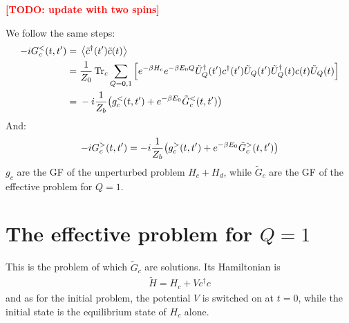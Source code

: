 \documentclass[12pt]{article}
\newcommand\TODO[1]{\textcolor{red}{\textbf{[TODO: #1]}}}
\begin{document}
\TODO{update with two spins}

We follow the same steps:
\begin{align}
	-i G^<_c(t, t') ={}& \expval{\tilde c^\dagger(t') \tilde c(t)}
	\\
	={}& \frac{1}{Z_0} \Tr_c \sum_{Q=0,1} \qty[e^{-\beta H_c} e^{-\beta E_0 Q} \tilde U_Q^\dagger(t') c^\dagger(t') \tilde U_Q(t') \tilde U_Q^\dagger(t) c(t) \tilde U_Q(t)]
	\\
	={}& -i \frac{1}{Z_b} \qty(g^<_c(t, t') + e^{-\beta E_0} \tilde G^<_c(t, t'))
\end{align}
And:
\begin{equation}
	-i G^>_c(t, t') = -i \frac{1}{Z_b} \qty(g^>_c(t, t') + e^{-\beta E_0} \tilde G^>_c(t, t'))
\end{equation}
$g_c$ are the \ac{GF} of the unperturbed problem $H_c + H_d$, while $\tilde G_c$ are the \ac{GF} of the effective problem for $Q=1$.

\section{The effective problem for $Q=1$}

This is the problem of which $\tilde G_c$ are solutions. Its Hamiltonian is
\begin{align}
	\tilde H = H_c + V c^\dagger c
\end{align}
and as for the initial problem, the potential $V$ is switched on at $t=0$, while the initial state is the equilibrium state of $H_c$ alone.




%
%

%
%
\printbibliography
\end{document}
